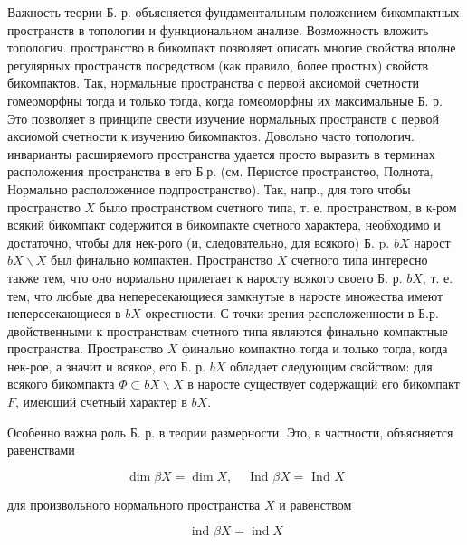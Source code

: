 \documentclass[10pt]{article}
\begin{document}
Важность теории Б. р. объясняется фундаментальным положением бикомпактных пространств в топологии и функциональном анализе. Возможность вложить топологич. пространство в бикомпакт позволяет описать многие свойства вполне регулярных пространств посредством (как правило, более простых) свойств бикомпактов. Так, нормальные пространства с первой аксиомой счетности гомеоморфны тогда и только тогда, когда гомеоморфны их максимальные Б. р. Это позволяет в принципе свести изучение нормальных пространств с первой аксиомой счетности к изучению бикомпактов. Довольно часто топологич. инварианты расширяемого пространства удается просто выразить в терминах расположения пространства в его Б.р. (см. Перистое пространстөо, Полнота, Нормально расположенное подпространство). Так, напр., для того чтобы пространство $X$ было пространством счетного типа, т. е. пространством, в к-ром всякий бикомпакт содержится в бикомпакте счетного характера, необходимо и достаточно, чтобы для нек-рого (и, следовательно, для всякого) Б. p. $b X$ нарост $b X \backslash X$ был финально компактен. Пространство $X$ счетного типа интересно также тем, что оно нормально прилегает к наросту всякого своего Б. р. $b X$, т. е. тем, что любые два непересекающиеся замкнутые в наросте множества имеют непересекающиеся в $b X$ окрестности. С точки зрения расположенности в Б.р. двойственными к пространствам счетного типа являются финально компактные пространства. Пространство $X$ финально компактно тогда и только тогда, когда нек-рое, а значит и всякое, его Б. р. $b X$ обладает следующим свойством: для всякого бикомпакта $\Phi \subset b X \backslash X$ в наросте существует содержащий его бикомпакт $F$, имеющий счетный характер в $b X$.



Особенно важна роль Б. р. в теории размерности. Это, в частности, объясняется равенствами



\[

\operatorname{dim} \beta X=\operatorname{dim} X, \quad \text { Ind } \beta X=\text { Ind } X

\]



для произвольного нормального пространства $X$ и равенством



\[

\text { ind } \beta X=\operatorname{ind} X

\]
\end{document}
